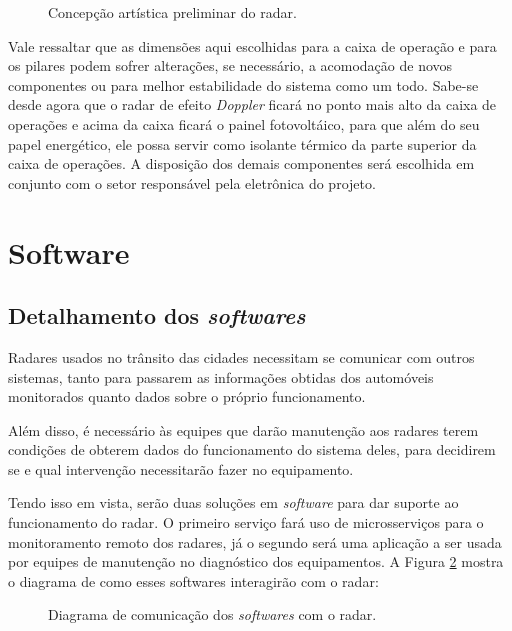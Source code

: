 \begin{figure}[h]
    \caption{\label{fig:radop} Concepção artística preliminar do radar.}
\end{figure}

Vale ressaltar que as dimensões aqui escolhidas para a caixa de operação e para os pilares podem sofrer alterações, se necessário, a acomodação de novos componentes ou para melhor estabilidade do sistema como um todo. Sabe-se desde agora que o radar de efeito \textit{Doppler} ficará no ponto mais alto da caixa de operações e acima da caixa ficará o painel fotovoltáico, para que além do seu papel energético, ele possa servir como isolante térmico da parte superior da caixa de operações. A disposição dos demais componentes será escolhida em conjunto com o setor responsável pela eletrônica do projeto.

\section{Software}

\subsection{Detalhamento dos \emph{softwares}}
Radares usados no trânsito das cidades necessitam se comunicar com outros sistemas, tanto para passarem as informações obtidas dos automóveis monitorados quanto dados sobre o próprio funcionamento.

Além disso, é necessário às equipes que darão manutenção aos radares terem condições de obterem dados do funcionamento do sistema deles, para decidirem se e qual intervenção necessitarão fazer no equipamento.

Tendo isso em vista, serão duas soluções em \emph{software} para dar suporte ao funcionamento do radar. O primeiro serviço fará uso de microsserviços para o monitoramento remoto dos radares, já o segundo será uma aplicação a ser usada por equipes de manutenção no diagnóstico dos equipamentos. A Figura \ref{fig:diagrama-in-out-software} mostra o diagrama de como esses softwares interagirão com o radar:

\begin{figure}[!htb]
    \caption{\label{fig:diagrama-in-out-software} Diagrama de comunicação dos \emph{softwares} com o radar.}
\end{figure}

